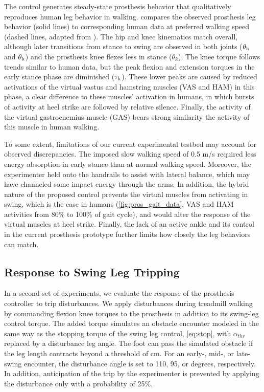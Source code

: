The control generates steady-state prosthesis behavior that qualitatively
reproduces human leg behavior in walking.  compares the
observed prosthesis leg behavior (solid lines) to corresponding human data at
preferred walking speed (dashed lines, adapted from
\citet{winter2009biomechanics,perry2010gait}). The hip and knee kinematics match
overall, although later transitions from stance to swing are observed in both
joints ($\theta_{\mathrm{h}}$ and $\theta_{\mathrm{k}}$) and the prosthesis knee flexes less
in stance ($\theta_k$). The knee torque follows trends similar to human data,
but the peak flexion and extension torques in the early stance phase are
diminished ($\tau_{\mathrm{k}}$). These lower peaks are caused by reduced activations
of the virtual vastus and hamstring muscles (VAS and HAM) in this phase, a clear
difference to these muscles' activation in humans, in which bursts of activity
at heel strike are followed by relative silence. Finally, the activity of the
virtual gastrocnemius muscle (GAS) bears strong similarity the activity of this
muscle in human walking.

To some extent, limitations of our current experimental testbed may
account for observed discrepancies. The imposed slow walking speed of 0.5 m/s
required less energy absorption in early stance than at normal walking speed.
Moreover, the experimenter held onto the handrails to assist with lateral
balance, which may have channeled some impact energy through the arms. In
addition, the hybrid nature of the proposed control prevents the virtual
muscles from activating in swing, which is the case in humans
(\cref{fig:pros_gait_data}, VAS and HAM activities from 80\% to 100\% of gait
cycle), and would alter the response of the virtual muscles at heel strike.
Finally, the lack of an active ankle and its control in the current prosthesis
prototype further limits how closely the leg behaviors can match.

\subsection{Response to Swing Leg Tripping}\label{sec:completed_exp_swing_trip}
 

In a second set of experiments, we evaluate the response of the prosthesis
controller to trip disturbances. We apply disturbances during treadmill walking
by commanding flexion knee torques to the prosthesis in addition to its
swing-leg control torque. The added torque simulates an obstacle encounter
modeled in the same way as the stopping torque of the swing leg control,
\cref{eq:stop}, with $\alpha_{thr}$ replaced by a disturbance leg angle. The
foot can pass the simulated obstacle if the leg length contracts beyond a
threshold of \unit[94]{cm}. For an early-, mid-, or late-swing encounter, the
disturbance angle is set to 110, 95, or \unit[80]{degrees}, respectively. In
addition, anticipation of the trip by the experimenter is prevented by applying
the disturbance only with a probability of 25\%.

